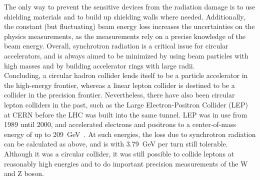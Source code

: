 The only way to prevent the sensitive devices from the radiation damage is to use shielding materials and to build up shielding walls where needed.
Additionally, the constant (but fluctuating) beam energy loss increases the uncertainties on the physics measurements, as the measurements rely on a precise knowledge of the beam energy.
\newpage
Overall, synchrotron radiation is a critical issue for circular accelerators, and is always aimed to be minimized by using beam particles with high masses and by building accelerator rings with large radii.
\\Concluding, a circular hadron collider lends itself to be a particle accelerator in the high-energy frontier, whereas a linear lepton collider is destined to be a collider in the precision frontier.
Nevertheless, there have also been circular lepton colliders in the past, such as the Large Electron-Positron Collider (LEP) at CERN before the LHC was built into the same tunnel.
LEP was in use from 1989 until 2000, and accelerated electrons and positrons to a center-of-mass energy of up to \SI{209}{\GeV}~\cite{LEP}.
At such energies, the loss due to synchrotron radiation can be calculated as above, and is with \SI{3.79}{\GeV} per turn still tolerable.
Although it was a circular collider, it was still possible to collide leptons at reasonably high energies and to do important precision measurements of the W and Z boson.

